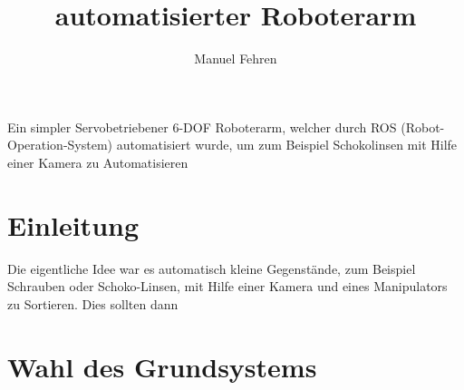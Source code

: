 \documentclass[12pt,a4paper]{article}
\author{Manuel Fehren}
\title{automatisierter Roboterarm}
\begin{document}
\maketitle
\begin{center}
Ein simpler Servobetriebener 6-DOF Roboterarm, welcher durch ROS (Robot-Operation-System) automatisiert wurde, um zum Beispiel Schokolinsen mit Hilfe einer Kamera zu Automatisieren
\end{center}
\newpage
\tableofcontents
\newpage
\section{Einleitung}
Die eigentliche Idee war es automatisch kleine Gegenstände, zum Beispiel Schrauben oder Schoko-Linsen, mit Hilfe einer Kamera und eines Manipulators zu Sortieren. Dies sollten dann
\section{Wahl des Grundsystems}
\end{document}
